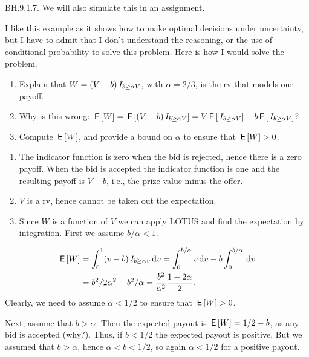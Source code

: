 \begin{exercise}
BH.9.1.7. We will also simulate this in an assignment.

I  like this example as it  shows how to make optimal decisions under uncertainty, but I have to admit that I don't understand the reasoning, or the use of conditional probability to solve this problem. Here is how I would solve the problem.
\begin{enumerate}
\item Explain that $W=(V-b)\,I_{b \geq \alpha V}$, with $\alpha=2/3$, is the rv that models our payoff.
\item Why is this wrong: $\,\mathsf{E}\left[W\right] = \,\mathsf{E}\left[(V-b)\,I_{b \geq \alpha V}\right] = V \,\mathsf{E}\left[\,I_{b \geq \alpha V}\right] -b \,\mathsf{E}\left[\,I_{b \geq \alpha V}\right]$?
\item Compute $\,\mathsf{E}\left[W\right]$, and provide a bound on $\alpha$ to ensure that $\,\mathsf{E}\left[W\right] > 0$.
\end{enumerate}
\begin{solution}
\begin{enumerate}
  \item The indicator function is zero when the bid is rejected, hence there is a zero payoff. When the bid is accepted the indicator function is one and the resulting payoff is $V-b$, i.e., the prize value minus the offer.
  \item $V$ is a rv, hence cannot be taken out the expectation.
  \item Since $W$ is a function of $V$ we can apply LOTUS and find the expectation by integration. First we assume $b/\alpha < 1$.
\end{enumerate}
\begin{align*}
\,\mathsf{E}\left[W\right] &= \int_0^1 (v-b) \,I_{b\geq \alpha v} \,\textrm{d}v = \int_0^{b/\alpha} v \,\textrm{d}v - b \int_0^{b/\alpha}  \,\textrm{d}v \\
  &= b^2/2\alpha^2 - b^2/\alpha = \frac{b^{2}}{\alpha^{2}} \frac{1-2\alpha}{2}.
\end{align*}
Clearly, we need to assume $\alpha<1/2$ to ensure that $\,\mathsf{E}\left[W\right] > 0$.

Next, assume that $b>\alpha$. Then the expected payout is $\,\mathsf{E}\left[W\right] = 1/2 -b $, as any bid is accepted (why?). Thus, if $b<1/2$ the expected payout is positive. But we assumed that $b>\alpha$, hence $\alpha < b < 1/2$, so again $\alpha<1/2$ for a positive payout.
\end{solution}
\end{exercise}

